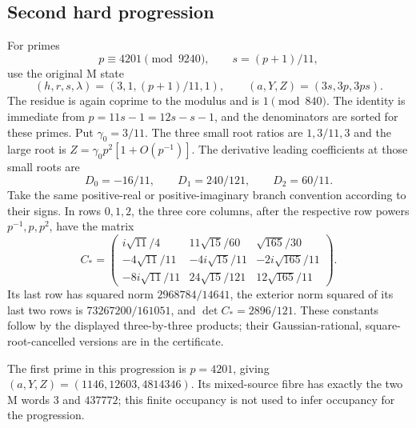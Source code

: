 \subsection{Second hard progression}
For primes
\[
 p\equiv4201\pmod{9240},\qquad s=(p+1)/11,
\]
use the original M state
\[
 (h,r,s,\lambda)=(3,1,(p+1)/11,1),\qquad
 (a,Y,Z)=(3s,3p,3ps).
\]
The residue is again coprime to the modulus and is $1\pmod{840}$.
The identity is immediate from $p=11s-1=12s-s-1$, and the denominators
are sorted for these primes. Put $\gamma_0=3/11$. The three small root
ratios are $1,3/11,3$ and the large root is
$Z=\gamma_0p^2[1+O(p^{-1})]$.
The derivative leading coefficients at those small roots are
\[
 D_0=-16/11,\qquad D_1=240/121,\qquad D_2=60/11.
\]
Take the same positive-real or positive-imaginary branch convention according
to their signs. In rows $0,1,2$, the three core columns, after the respective
row powers $p^{-1},p,p^2$, have the matrix
\[
 C_*=
 \begin{pmatrix}
 i\sqrt{11}/4&11\sqrt{15}/60&\sqrt{165}/30\\
 -4\sqrt{11}/11&-4i\sqrt{15}/11&-2i\sqrt{165}/11\\
 -8i\sqrt{11}/11&24\sqrt{15}/121&12\sqrt{165}/11
 \end{pmatrix}.
\]
Its last row has squared norm $2968784/14641$, the exterior norm squared
of its last two rows is $73267200/161051$, and
$\det C_*=2896/121$. These constants follow by the displayed three-by-three
products; their Gaussian-rational, square-root-cancelled versions are in the
certificate.

The first prime in this progression is $p=4201$, giving
$(a,Y,Z)=(1146,12603,4814346)$. Its mixed-source fibre has exactly the two
M words $3$ and $437772$; this finite occupancy is not used to infer occupancy
for the progression.

